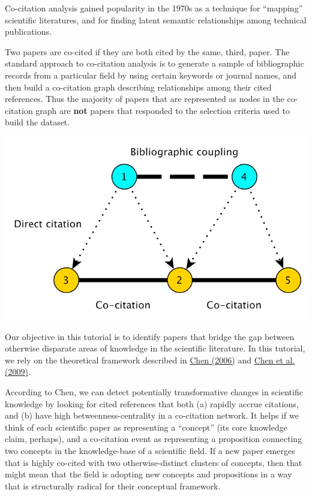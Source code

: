 \documentclass[letterpaper,10pt,english]{sphinxmanual}
\begin{document}
Co-citation analysis gained popularity in the 1970s as a technique for ``mapping''
scientific literatures, and for finding latent semantic relationships among technical
publications.

Two papers are co-cited if they are both cited by the same, third, paper. The standard
approach to co-citation analysis is to generate a sample of bibliographic records from a
particular field by using certain keywords or journal names, and then build a co-citation
graph describing relationships among their cited references. Thus the majority of papers
that are represented as nodes in the co-citation graph are \textbf{not} papers that responded
to the selection criteria used to build the dataset.

{\hfill\includegraphics{citationnetworks.png}\hfill}

Our objective in this tutorial is to identify papers that bridge the gap between
otherwise disparate areas of knowledge in the scientific literature. In this tutorial, we
rely on the theoretical framework described in \href{http://cluster.cis.drexel.edu/~cchen/citespace/doc/jasist2006.pdf}{Chen (2006)} and \href{http://arxiv.org/pdf/0904.1439.pdf}{Chen et al.
(2009)}.

According to Chen, we can detect potentially transformative changes in scientific
knowledge by looking for cited references that both (a) rapidly accrue citations, and (b)
have high betweenness-centrality in a co-citation network. It helps if we think of each
scientific paper as representing a ``concept'' (its core knowledge claim, perhaps), and a
co-citation event as representing a proposition connecting two concepts in the
knowledge-base of a scientific field. If a new paper emerges that is highly co-cited with
two otherwise-distinct clusters of concepts, then that might mean that the field is
adopting new concepts and propositions in a way that is structurally radical for their
conceptual framework.
\end{document}
